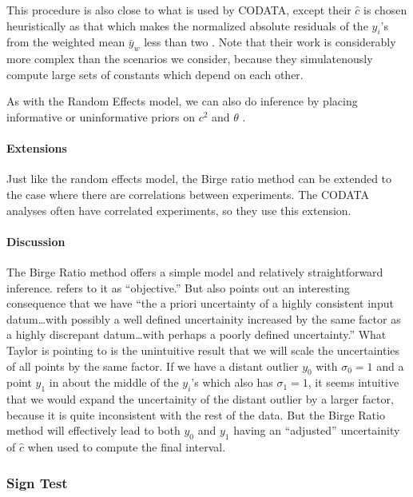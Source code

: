 \documentclass[12pt]{article}
\begin{document}
This procedure is also close to what is used by CODATA, except their $\hat c$ is chosen heuristically as that which makes the normalized absolute residuals of the $y_i$'s from the weighted mean $\bar y_w$ less than two \citep{tiesinga2021codata}. Note that their work is considerably more complex than the scenarios we consider, because they simulatenously compute large sets of constants which depend on each other.

As with the Random Effects model, we can also do inference by placing informative or uninformative priors on $c^2$ and $\theta$ \citep{bodnar2014adjustment}.

\paragraph{Extensions}\label{extensions-1}

Just like the random effects model, the Birge ratio method can be extended to the case where there are correlations between experiments. The CODATA analyses often have correlated experiments, so they use this extension.

\paragraph{Discussion}\label{discussion}

The Birge Ratio method offers a simple model and relatively straightforward inference. \citet{taylor1982numerical} refers to it as ``objective.'' But \citet{taylor1982numerical} also points out an interesting consequence that we have ``the a priori uncertainty of a highly consistent input datum\ldots with possibly a well defined uncertainity increased by the same factor as a highly discrepant datum\ldots with perhaps a poorly defined uncertainty.'' What Taylor is pointing to is the unintuitive result that we will scale the uncertainties of all points by the same factor. If we have a distant outlier $y_0$ with $\sigma_0=1$ and a point $y_1$ in about the middle of the $y_i$'s which also has $\sigma_1=1$, it seems intuitive that we would expand the uncertainity of the distant outlier by a larger factor, because it is quite inconsistent with the rest of the data. But the Birge Ratio method will effectively lead to both $y_0$ and $y_1$ having an ``adjusted'' uncertainity of $\hat c$ when used to compute the final interval.

\subsubsection{Sign Test}\label{sign-test}
\end{document}
